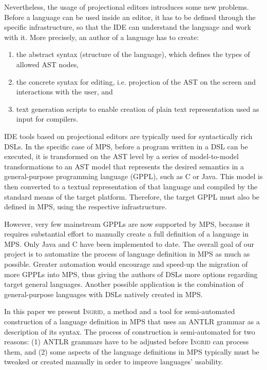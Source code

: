 Nevertheless, the usage of projectional editors introduces some new problems.
Before a language can be used inside an editor, it has to be defined through the specific infrastructure, so that the IDE can understand the language and work with it.
More precisely, an author of a language has to create:
\begin{enumerate}
	\item the abstract syntax (structure of the language), which defines the types of allowed AST nodes,
	\item the concrete syntax for editing, i.e. projection of the AST on the screen and interactions with the user, and
	\item text generation scripts to enable creation of plain text representation used as input for compilers.
\end{enumerate}	

IDE tools based on projectional editors are typically used for syntactically rich DSLs.
In the specific case of MPS, before a program written in a DSL can be executed, it is transformed on the AST level by a series of model-to-model transformations to an AST model that represents the desired semantics in a general-purpose programming language (GPPL), such as C or Java.
This model is then converted to a textual representation of that language and compiled by the standard means of the target platform.
Therefore, the target GPPL must also be defined in MPS, using the respective infrastructure.

However, very few mainstream GPPLs are now supported by MPS, because it requires substantial effort to manually create a full definition of a language in MPS.
Only Java and C have been implemented to date.
The overall goal of our project is to automatize the process of language definition in MPS as much as possible.
Greater automation would encourage and speed-up the migration of more GPPLs into MPS, thus giving the authors of DSLs more options regarding target general languages.
Another possible application is the combination of general-purpose languages with DSLs natively created in MPS.

In this paper we present \textsc{Ingrid}, a method and a tool for semi-automated construction of a language definition in MPS that uses an ANTLR grammar as a description of its syntax.
The process of construction is semi-automated for two reasons: (1) ANTLR grammars have to be adjusted before \textsc{Ingrid} can process them, and (2) some aspects of the language definitions in MPS typically must be tweaked or created manually in order to improve languages' usability.

